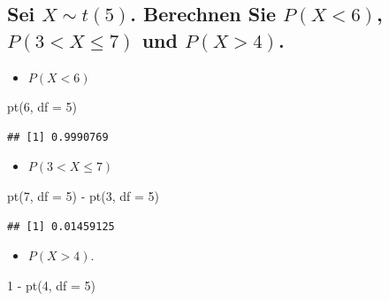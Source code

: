 \documentclass[12pt,a4paper]{article}
\newenvironment{Shaded}{\begin{snugshade}}{\end{snugshade}}
\newcommand{\AttributeTok}[1]{\textcolor[rgb]{0.77,0.63,0.00}{#1}}
\newcommand{\DecValTok}[1]{\textcolor[rgb]{0.00,0.00,0.81}{#1}}
\newcommand{\FunctionTok}[1]{\textcolor[rgb]{0.00,0.00,0.00}{#1}}
\newcommand{\NormalTok}[1]{#1}
\newcommand{\SpecialCharTok}[1]{\textcolor[rgb]{0.00,0.00,0.00}{#1}}
\begin{document}
\hypertarget{sei-xsim-t5.-berechnen-sie-px6-p3xleq7-und-px4.}{%
\subsection{\texorpdfstring{Sei \(X\sim t(5)\). Berechnen Sie
\(P(X<6)\), \(P(3<X\leq7)\) und
\(P(X>4)\).}{Sei X\textbackslash sim t(5). Berechnen Sie P(X\textless6), P(3\textless X\textbackslash leq7) und P(X\textgreater4).}}\label{sei-xsim-t5.-berechnen-sie-px6-p3xleq7-und-px4.}}

\begin{itemize}
  \item  $P(X<6)$
\end{itemize}

\begin{Shaded}
\begin{Highlighting}[]
    \FunctionTok{pt}\NormalTok{(}\DecValTok{6}\NormalTok{, }\AttributeTok{df =} \DecValTok{5}\NormalTok{)}
\end{Highlighting}
\end{Shaded}

\begin{verbatim}
## [1] 0.9990769
\end{verbatim}

\begin{itemize}
  \item  $P(3< X \leq 7)$
\end{itemize}

\begin{Shaded}
\begin{Highlighting}[]
    \FunctionTok{pt}\NormalTok{(}\DecValTok{7}\NormalTok{, }\AttributeTok{df =} \DecValTok{5}\NormalTok{) }\SpecialCharTok{{-}} \FunctionTok{pt}\NormalTok{(}\DecValTok{3}\NormalTok{, }\AttributeTok{df =} \DecValTok{5}\NormalTok{)}
\end{Highlighting}
\end{Shaded}

\begin{verbatim}
## [1] 0.01459125
\end{verbatim}

\begin{itemize}
  \item $P(X>4)$.
\end{itemize}

\begin{Shaded}
\begin{Highlighting}[]
    \DecValTok{1} \SpecialCharTok{{-}} \FunctionTok{pt}\NormalTok{(}\DecValTok{4}\NormalTok{, }\AttributeTok{df =} \DecValTok{5}\NormalTok{)}
\end{Highlighting}
\end{Shaded}
\end{document}
